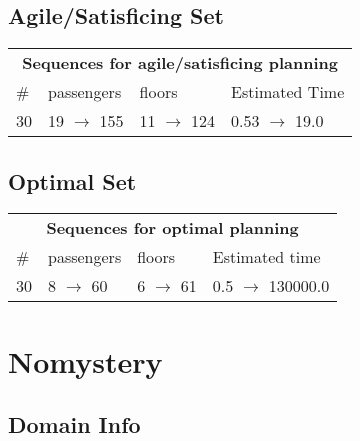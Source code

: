 \documentclass{article}
\begin{document}
                         \subsection*{Agile/Satisficing Set}

                        \begin{center}
                        \begin{tabular}{l|l|l|l}
                        \multicolumn{4}{c}{\bf \large Sequences for agile/satisficing planning}\\
                        \# & passengers & floors & Estimated Time\\\midrule
                        30&19 $\rightarrow$ 155&11 $\rightarrow$ 124&0.53 $\rightarrow$ 19.0
                        \end{tabular}
                        \end{center}
                    
                            \subsection*{Optimal Set}

                            \begin{center}
                            \begin{tabular}{l|l|l|l}
                            \multicolumn{4}{c}{\bf \large Sequences for optimal planning}\\
                            \# & passengers & floors & Estimated time\\\midrule
                            30&8 $\rightarrow$ 60&6 $\rightarrow$ 61&0.5 $\rightarrow$ 130000.0
                            \end{tabular}
                            \end{center}
                    \newpage \section{Nomystery}
                    \subsection*{Domain Info}
\end{document}
